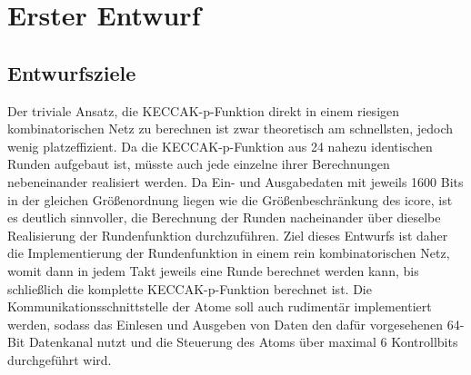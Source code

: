 \section{Erster Entwurf}
\subsection{Entwurfsziele}
Der triviale Ansatz, die KECCAK-p-Funktion direkt in einem riesigen kombinatorischen Netz zu berechnen ist zwar theoretisch am schnellsten,
jedoch wenig platzeffizient. Da die KECCAK-p-Funktion aus 24 nahezu identischen Runden aufgebaut ist, müsste auch jede einzelne
ihrer Berechnungen nebeneinander realisiert werden. Da Ein- und Ausgabedaten mit jeweils 1600 Bits in der gleichen Größenordnung liegen
wie die Größenbeschränkung des icore, ist es deutlich sinnvoller, die Berechnung der Runden nacheinander über dieselbe Realisierung der Rundenfunktion durchzuführen.
Ziel dieses Entwurfs ist daher die Implementierung der Rundenfunktion in einem rein kombinatorischen Netz, womit dann in jedem Takt
jeweils eine Runde berechnet werden kann, bis schließlich die komplette KECCAK-p-Funktion berechnet ist. Die Kommunikationsschnittstelle
der Atome soll auch rudimentär implementiert werden, sodass das Einlesen und Ausgeben von Daten den dafür vorgesehenen 64-Bit Datenkanal nutzt
und die Steuerung des Atoms über maximal 6 Kontrollbits durchgeführt wird.

